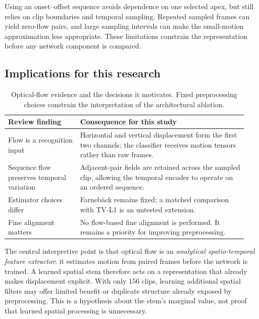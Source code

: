 Using an onset--offset sequence avoids dependence on one selected apex, but still relies on clip boundaries and temporal sampling. Repeated sampled frames can yield zero-flow pairs, and large sampling intervals can make the small-motion approximation less appropriate. These limitations constrain the representation before any network component is compared.

\subsection{Implications for this research}
\label{sec:flow-implications}

\begin{table}[htbp]
    \centering
    \small
    \begin{tabular}{@{}p{0.29\linewidth} p{0.65\linewidth}@{}}
        \hline
        \textbf{Review finding} & \textbf{Consequence for this study} \\
        \hline
        Flow is a recognition input~\cite{liong2019a,see2019}
        & Horizontal and vertical displacement form the first two channels; the classifier receives motion tensors rather than raw frames. \\
        Sequence flow preserves temporal variation~\cite{zhaoS2021}
        & Adjacent-pair fields are retained across the sampled clip, allowing the temporal encoder to operate on an ordered sequence. \\
        Estimator choices differ~\cite{liong2019a,zhaoS2021,xu2017}
        & Farneb\"ack remains fixed; a matched comparison with TV-L1 is an untested extension. \\
        Fine alignment matters~\cite{xu2017}
        & No flow-based fine alignment is performed. It remains a priority for improving preprocessing. \\
        \hline
    \end{tabular}
    \caption[Optical-flow evidence and study decisions]{Optical-flow evidence and the decisions it motivates. Fixed preprocessing choices constrain the interpretation of the architectural ablation.}
    \label{tab:flow-decisions}
\end{table}

The central interpretive point is that optical flow is an \textit{analytical spatio-temporal feature extractor}: it estimates motion from paired frames before the network is trained. A learned spatial stem therefore acts on a representation that already makes displacement explicit. With only 156 clips, learning additional spatial filters may offer limited benefit or duplicate structure already exposed by preprocessing. This is a hypothesis about the stem's marginal value, not proof that learned spatial processing is unnecessary.

